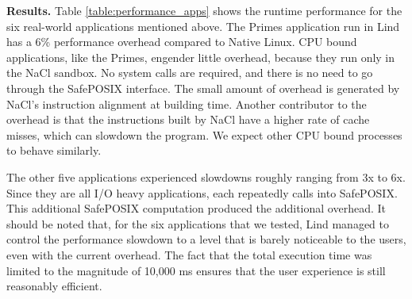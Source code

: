 {{{{\noindent
\textbf{Results.}
Table \ref{table:performance_apps} shows the runtime performance
for the six real-world applications mentioned above.
The Primes application run in Lind has a 6\% performance overhead compared to
Native Linux. CPU bound applications, like the Primes, engender little overhead,
because they run only in the NaCl sandbox. No system calls are
required, and there is no need to go through the SafePOSIX interface. The small
 amount of overhead is generated by NaCl's instruction alignment at building time.
  Another contributor to the overhead is that the instructions built by NaCl
  have a higher rate of cache misses, which can slowdown the
program. We expect other CPU bound processes to behave similarly.

The other five applications experienced slowdowns roughly ranging from 3x to 6x.
Since they are all I/O heavy applications,
each repeatedly calls into SafePOSIX. This additional SafePOSIX computation produced the additional
overhead. It should be noted that, for the six applications that we tested,
Lind managed to control the performance slowdown to a
level that is barely noticeable to the users, even
 with the current overhead. The fact that the total execution time was limited
 to the magnitude of 10,000 ms ensures that the
user experience is still reasonably efficient.

}}}}
